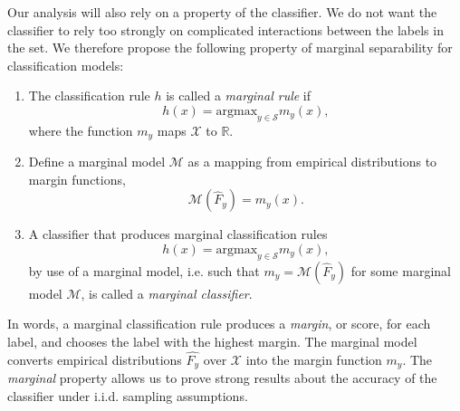 \documentclass[12pt]{article}
\begin{document}
Our analysis will also rely on a property of the classifier. We do not
want the classifier to rely too strongly on complicated interactions
between the labels in the set. We therefore propose the following
property of marginal separability for classification models:

\begin{definition}
\begin{enumerate}
\item The classification rule $h$ is called a \emph{marginal rule} if 
\[
h(x) = \text{argmax}_{y \in \mathcal{S}} m_y(x),
\]
where the function $m_y$ maps $\mathcal{X}$ to $\mathbb{R}$. 
\item Define a marginal model $\mathcal{M}$ as a mapping from empirical distributions
to margin functions,
\[
\mathcal{M}(\hat{F}_y) = m_y(x).
\]
\item A classifier that produces marginal classification rules
\[
h(x) = \text{argmax}_{y \in \mathcal{S}} m_y(x),
\]
by use of a marginal model, i.e. such that
$m_y=\mathcal{M}(\hat{F}_y)$ for some marginal model $\mathcal{M}$,
is called a \emph{marginal classifier}.
\end{enumerate}
\end{definition}
In words, a marginal classification rule produces a \emph{margin}, or
score, for each label, and chooses the label with the highest
margin. The marginal model converts empirical distributions
$\hat{F_y}$ over $\mathcal{X}$ into the margin function
$m_y$.  The \emph{marginal} property allows us to prove strong results
about the accuracy of the classifier under i.i.d. sampling assumptions.
\end{document}
